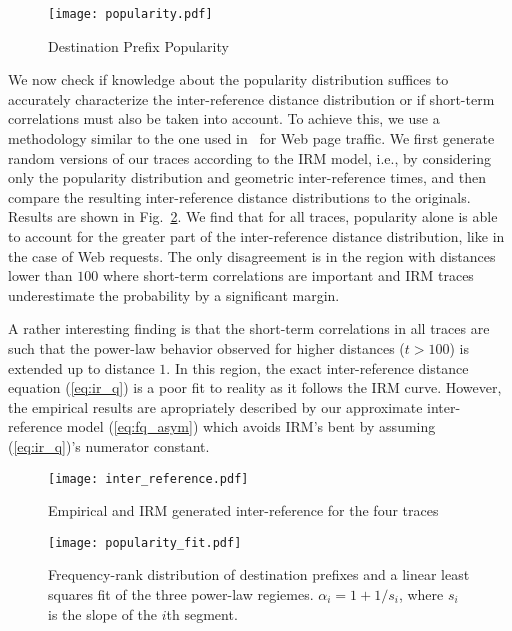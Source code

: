 \documentclass[twocolumn, 10pt]{article}
\theoremstyle{plain}
\begin{document}
\begin{figure}[t!]
    \centering
    \texttt{[image: popularity.pdf]}
    \caption{Destination Prefix Popularity}
    \label{fig:pop}
\end{figure}

We now check if knowledge about the popularity distribution suffices to
accurately characterize the inter-reference distance distribution or if
short-term correlations must also be taken into account. To achieve this, we
use a methodology similar to the one used in~\cite{jin:web_tloc} for Web page
traffic. We first generate random versions of our traces according to the IRM
model, i.e., by considering only the popularity distribution and geometric
inter-reference times, and then compare the resulting inter-reference distance
distributions to the originals. Results are shown in
Fig.~\ref{fig:ir_comparison}. We find that for all traces, popularity alone is
able to account for the greater part of the inter-reference distance
distribution, like in the case of Web requests. The only disagreement is in
the region with distances lower than $100$ where short-term correlations are
important and IRM traces underestimate the probability by a significant
margin.

A rather interesting finding is that the short-term correlations in all traces
are such that the power-law behavior observed for higher distances ($t>100$) is extended
up to distance $1$. In this region, the exact inter-reference distance
equation (\ref{eq:ir_q}) is a poor fit to reality as it follows
the IRM curve. However, the empirical results are apropriately described by our
approximate inter-reference model (\ref{eq:fq_asym}) which avoids IRM's bent by assuming
(\ref{eq:ir_q})'s numerator constant. 

\begin{figure}[t]
    \centering
    \texttt{[image: inter\_reference.pdf]}
    \caption{Empirical and IRM generated inter-reference for the four traces}
    \label{fig:ir_comparison}
\end{figure}

\begin{figure}[t]
    \centering
    \texttt{[image: popularity\_fit.pdf]}
    \caption{Frequency-rank distribution of destination prefixes and a
    linear least squares fit of the three power-law regiemes.
    $\alpha_i=1+1/s_i$, where $s_i$ is the slope of the $i$th segment.}
    \label{fig:pop_fit}
\end{figure}
\end{document}
